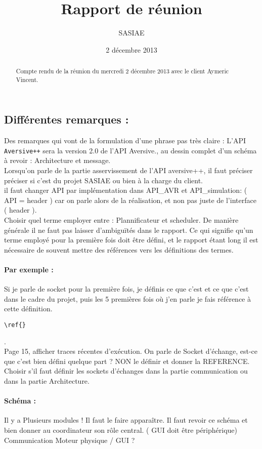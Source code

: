 \documentclass[a4paper,10pt]{article}
\title{Rapport de réunion}           %
\author{SASIAE}
\date{2 décembre 2013}
\begin{document}
\maketitle                    %

\begin{abstract}
Compte rendu de la réunion du mercredi 2 décembre 2013 avec le client Aymeric Vincent.
\end{abstract}
\subsection{Différentes remarques :}
Des remarques qui vont de la formulation d'une phrase pas très claire
: \og L'API \texttt{Aversive++} sera la version 2.0 de l'API
Aversive.\fg , au dessin complet d'un schéma à revoir : Architecture
et message.\\
Lorsqu'on parle de la partie asservissement de l'API aversive++, 
il faut préciser préciser si c'est du projet SASIAE ou bien à la
charge du client.\\
il faut changer \og API \fg par \og implémentation \fg dans API\_AVR
et API\_simulation: ( API = header ) car on parle alors de la
réalisation, et non pas juste de l'interface ( header ).\\
Choisir quel terme employer entre : Plannificateur  et scheduler. De
manière générale il ne faut pas laisser d'ambiguïtés dans le rapport. 
Ce qui signifie qu'un terme employé pour la première fois doit être
défini, et le rapport étant long il est nécessaire de souvent mettre
des références vers les définitions des termes.
\paragraph{Par exemple :} Si je parle de socket pour la première fois,
je définis ce que c'est et ce que c'est dans le cadre du projet, puis
les 5 premières fois où j'en parle je fais référence à cette
définition. \begin{verbatim}\ref{} \end{verbatim}.\\
Page 15, afficher traces récentes d'exécution. On parle de Socket
d'échange, est-ce que c'est bien défini quelque part ? NON le définir
et donner la REFERENCE.
Choisir s'il faut définir les sockets d'échanges dans la partie
communication ou dans la partie Architecture.\\
\paragraph{Schéma :}
Il y a Plusieurs modules ! Il faut le faire apparaître. Il faut revoir
ce schéma et bien donner au coordinateur son rôle central. ( GUI doit être
périphérique)\\
Communication Moteur physique / GUI ? 
\end{document}
